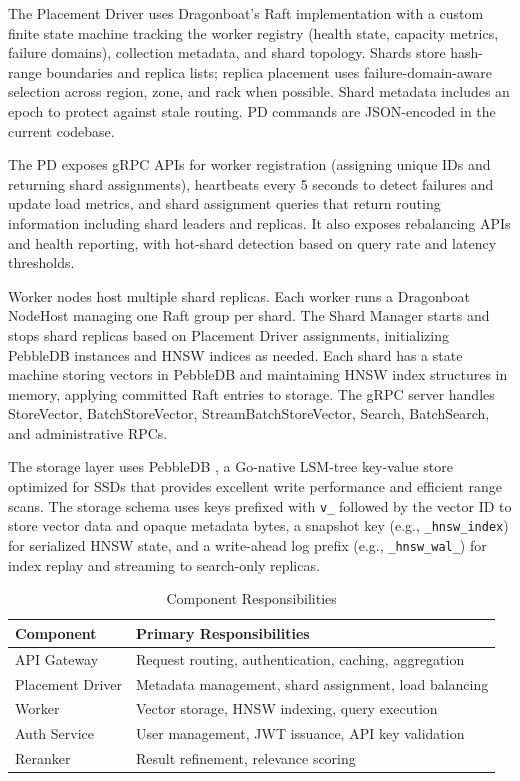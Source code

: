 \documentclass[conference]{IEEEtran}
\begin{document}
The Placement Driver uses Dragonboat's Raft implementation with a custom finite state machine tracking the worker registry (health state, capacity metrics, failure domains), collection metadata, and shard topology. Shards store hash-range boundaries and replica lists; replica placement uses failure-domain-aware selection across region, zone, and rack when possible. Shard metadata includes an epoch to protect against stale routing. PD commands are JSON-encoded in the current codebase.

The PD exposes gRPC APIs for worker registration (assigning unique IDs and returning shard assignments), heartbeats every 5 seconds to detect failures and update load metrics, and shard assignment queries that return routing information including shard leaders and replicas. It also exposes rebalancing APIs and health reporting, with hot-shard detection based on query rate and latency thresholds.

Worker nodes host multiple shard replicas. Each worker runs a Dragonboat NodeHost managing one Raft group per shard. The Shard Manager starts and stops shard replicas based on Placement Driver assignments, initializing PebbleDB instances and HNSW indices as needed. Each shard has a state machine storing vectors in PebbleDB and maintaining HNSW index structures in memory, applying committed Raft entries to storage. The gRPC server handles StoreVector, BatchStoreVector, StreamBatchStoreVector, Search, BatchSearch, and administrative RPCs.

The storage layer uses PebbleDB \cite{pebble}, a Go-native LSM-tree key-value store optimized for SSDs that provides excellent write performance and efficient range scans. The storage schema uses keys prefixed with \texttt{v\_} followed by the vector ID to store vector data and opaque metadata bytes, a snapshot key (e.g., \texttt{\_hnsw\_index}) for serialized HNSW state, and a write-ahead log prefix (e.g., \texttt{\_hnsw\_wal\_}) for index replay and streaming to search-only replicas.

\begin{table}[H]
\centering
\caption{Component Responsibilities}
\label{tab:components}
\begin{tabular}{@{}lp{6cm}@{}}
\toprule
\textbf{Component} & \textbf{Primary Responsibilities} \\
\midrule
API Gateway & Request routing, authentication, caching, aggregation \\
Placement Driver & Metadata management, shard assignment, load balancing \\
Worker & Vector storage, HNSW indexing, query execution \\
Auth Service & User management, JWT issuance, API key validation \\
Reranker & Result refinement, relevance scoring \\
\bottomrule
\end{tabular}
\end{table}
\end{document}
